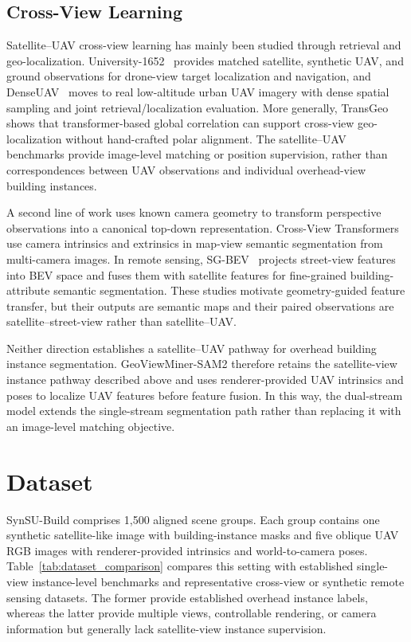 \documentclass[letterpaper,journal]{IEEEtran}
\begin{document}
\subsection{Cross-View Learning}
Satellite--UAV cross-view learning has mainly been studied through retrieval and
geo-localization. University-1652~\cite{ref_university} provides matched satellite, synthetic
UAV, and ground observations for drone-view target localization and navigation, and
DenseUAV~\cite{ref_denseuav} moves to real low-altitude urban UAV imagery with dense spatial
sampling and joint retrieval/localization evaluation. More generally,
TransGeo~\cite{ref_transgeo} shows that transformer-based global correlation can support
cross-view geo-localization without hand-crafted polar alignment. The satellite--UAV benchmarks
provide image-level matching or position supervision, rather than correspondences between UAV
observations and individual overhead-view building instances.

A second line of work uses known camera geometry to transform perspective observations into a
canonical top-down representation. Cross-View Transformers~\cite{ref_cvt} use camera intrinsics
and extrinsics in map-view semantic segmentation from multi-camera images. In remote sensing,
SG-BEV~\cite{ref_sgbeyv} projects street-view features into BEV space and fuses them with
satellite features for fine-grained building-attribute semantic segmentation. These studies
motivate geometry-guided feature transfer, but their outputs are semantic maps and their paired
observations are satellite--street-view rather than satellite--UAV.

Neither direction establishes a satellite--UAV pathway for overhead building instance
segmentation. GeoViewMiner-SAM2 therefore retains the satellite-view instance pathway described
above and uses renderer-provided UAV intrinsics and poses to localize UAV features before
feature fusion. In this way, the dual-stream model extends the single-stream segmentation path
rather than replacing it with an image-level matching objective.

\section{Dataset}
\label{sec:dataset}

SynSU-Build comprises 1,500 aligned scene groups. Each group contains one synthetic
satellite-like image with building-instance masks and five oblique UAV RGB images with
renderer-provided intrinsics and world-to-camera poses. Table~\ref{tab:dataset_comparison}
compares this setting with established single-view instance-level benchmarks and representative
cross-view or synthetic remote sensing datasets. The former provide established overhead
instance labels, whereas the latter provide multiple views, controllable rendering, or camera
information but generally lack satellite-view instance supervision.
\end{document}
